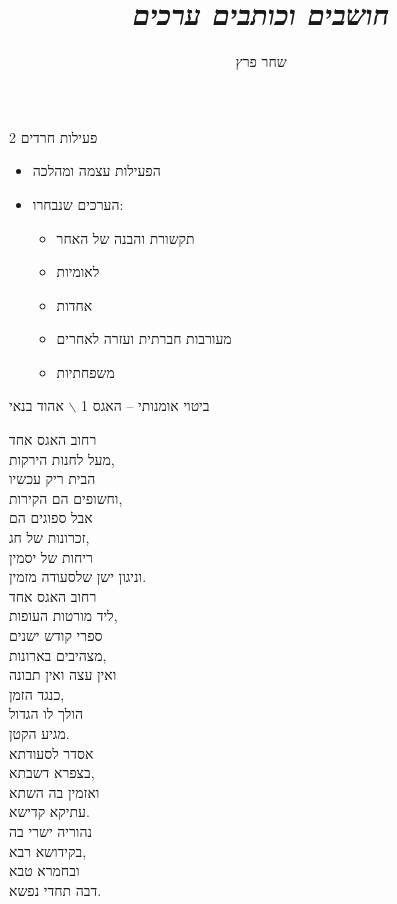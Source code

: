 \documentclass[]{beamer}
\author{שחר פרץ}
\title{\textit{חושבים וכותבים ערכים}}
\begin{document}
    \maketitle
    \begin{frame}{פעילות חרדים 2}
        \begin{itemize}
            \item הפעילות עצמה ומהלכה
            \item הערכים שנבחרו: 
            \begin{itemize}
                \item תקשורת והבנה של האחר
                \item לאומיות
                \item אחדות
                \item מעורבות חברתית ועזרה לאחרים
                \item משפחתיות
            \end{itemize}
        \end{itemize}
    \end{frame}
    
    \begin{frame}{ביטוי אומנותי – האגס 1 $\backslash$ אהוד בנאי}
        \begin{multicols}{2}
             רחוב האגס אחד \\
            מעל לחנות הירקות,\\
            הבית ריק עכשיו\\
            וחשופים הם הקירות,\\
            אבל ספוגים הם\\
            זכרונות של חג,\\
            ריחות של יסמין\\
            וניגון ישן שלסעודה מזמין. \\
            \vspace{0.2cm}
            רחוב האגס אחד\\
            ליד מורטות העופות,\\
            ספרי קודש ישנים\\
            מצהיבים בארונות,\\
            ואין עצה ואין תבונה\\
            כנגד הזמן,\\
            הולך לו הגדול\\
            מגיע הקטן.\\
            \vspace{0.2cm}
            אסדר לסעודתא\\
            בצפרא דשבתא,\\
            ואזמין בה השתא\\
            עתיקא קדישא.\\
            \vspace{0.2cm}
            נהוריה ישרי בה\\
            בקידושא רבא,\\
            ובחמרא טבא\\
            דבה תחדי נפשא. 
        \end{multicols}
    \end{frame}
    
\end{document}
